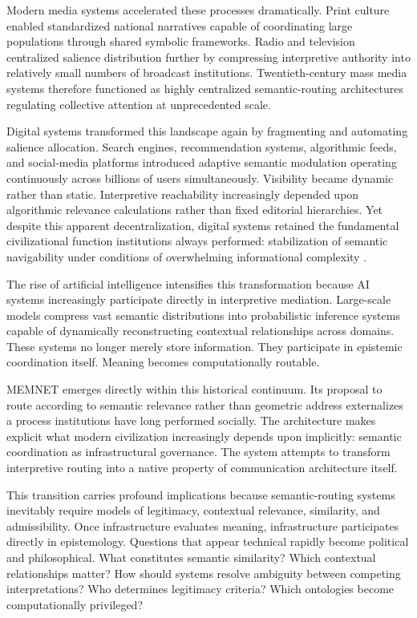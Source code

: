 \documentclass[11pt,a4paper]{article}
\begin{document}
Modern media systems accelerated these processes dramatically. Print culture enabled standardized national narratives capable of coordinating large populations through shared symbolic frameworks. Radio and television centralized salience distribution further by compressing interpretive authority into relatively small numbers of broadcast institutions. Twentieth-century mass media systems therefore functioned as highly centralized semantic-routing architectures regulating collective attention at unprecedented scale.

Digital systems transformed this landscape again by fragmenting and automating salience allocation. Search engines, recommendation systems, algorithmic feeds, and social-media platforms introduced adaptive semantic modulation operating continuously across billions of users simultaneously. Visibility became dynamic rather than static. Interpretive reachability increasingly depended upon algorithmic relevance calculations rather than fixed editorial hierarchies. Yet despite this apparent decentralization, digital systems retained the fundamental civilizational function institutions always performed: stabilization of semantic navigability under conditions of overwhelming informational complexity \cite{castells1996}.

The rise of artificial intelligence intensifies this transformation because AI systems increasingly participate directly in interpretive mediation. Large-scale models compress vast semantic distributions into probabilistic inference systems capable of dynamically reconstructing contextual relationships across domains. These systems no longer merely store information. They participate in epistemic coordination itself. Meaning becomes computationally routable.

MEMNET emerges directly within this historical continuum. Its proposal to route according to semantic relevance rather than geometric address externalizes a process institutions have long performed socially. The architecture makes explicit what modern civilization increasingly depends upon implicitly: semantic coordination as infrastructural governance. The system attempts to transform interpretive routing into a native property of communication architecture itself.

This transition carries profound implications because semantic-routing systems inevitably require models of legitimacy, contextual relevance, similarity, and admissibility. Once infrastructure evaluates meaning, infrastructure participates directly in epistemology. Questions that appear technical rapidly become political and philosophical. What constitutes semantic similarity? Which contextual relationships matter? How should systems resolve ambiguity between competing interpretations? Who determines legitimacy criteria? Which ontologies become computationally privileged?
\end{document}
